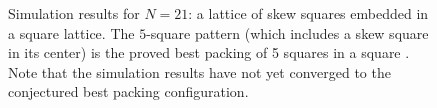 \begin{figure}[H]
\caption{\label{fig:n21}Simulation results for $N=21$: a lattice of skew squares embedded in a square lattice.  The $5$-square pattern (which includes a skew square in its center) is the proved best packing of 5 squares in a square \cite{Friedman2002}. Note that the simulation results have not yet converged to the conjectured best packing configuration.}
\end{figure}

\begin{figure}[H]
\caption{\label{fig:aligned}}
\end{figure}

